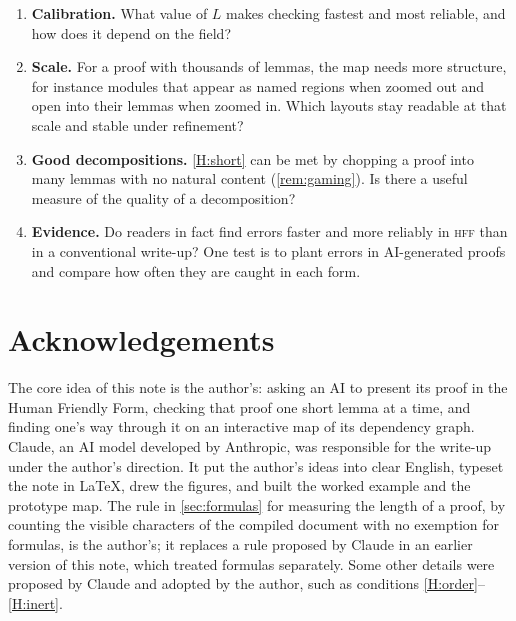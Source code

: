 \documentclass[11pt]{article}
\theoremstyle{plain}
\theoremstyle{definition}
\theoremstyle{remark}
\theoremstyle{definition}
\theoremstyle{plain}
\theoremstyle{remark}
\newcommand{\HFF}{\textsc{hff}}
\begin{document}
\begin{enumerate}[leftmargin=2em, label=(\arabic*)]
  \item \textbf{Calibration.} What value of $L$ makes checking fastest and most reliable, and how does it depend on the field?
  \item \textbf{Scale.} For a proof with thousands of lemmas, the map needs more structure, for instance modules that appear as named regions when zoomed out and open into their lemmas when zoomed in. Which layouts stay readable at that scale and stable under refinement?
  \item \textbf{Good decompositions.} \ref{H:short} can be met by chopping a proof into many lemmas with no natural content (\cref{rem:gaming}). Is there a useful measure of the quality of a decomposition?
  \item \textbf{Evidence.} Do readers in fact find errors faster and more reliably in \HFF{} than in a conventional write-up? One test is to plant errors in AI-generated proofs and compare how often they are caught in each form.
\end{enumerate}

\section*{Acknowledgements}

The core idea of this note is the author's: asking an AI to present its proof in the Human Friendly Form, checking that proof one short lemma at a time, and finding one's way through it on an interactive map of its dependency graph. Claude, an AI model developed by Anthropic, was responsible for the write-up under the author's direction. It put the author's ideas into clear English, typeset the note in \LaTeX, drew the figures, and built the worked example and the prototype map. The rule in \cref{sec:formulas} for measuring the length of a proof, by counting the visible characters of the compiled document with no exemption for formulas, is the author's; it replaces a rule proposed by Claude in an earlier version of this note, which treated formulas separately. Some other details were proposed by Claude and adopted by the author, such as conditions \ref{H:order}--\ref{H:inert}.
\end{document}
